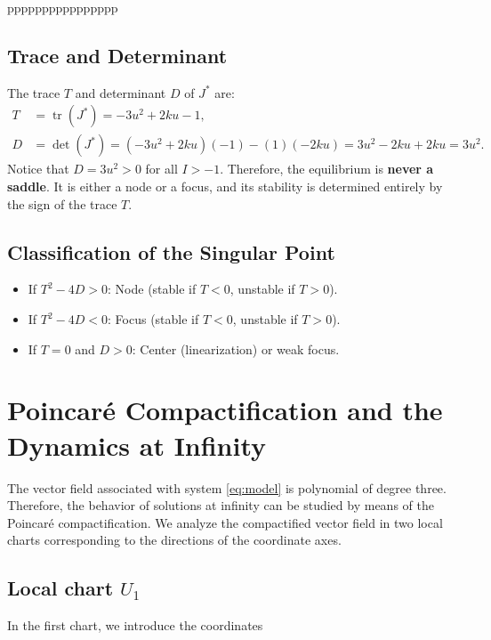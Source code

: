 \documentclass[11pt,reqno]{amsart}
\theoremstyle{plain}
\theoremstyle{definition}
\theoremstyle{remark}
\begin{document}
\newpage

pppppppppppppppp


\subsection{Trace and Determinant}
The trace \(T\) and determinant \(D\) of \(J^*\) are:
\begin{align}
T &= \operatorname{tr}(J^*) = -3u^2 + 2ku - 1, \\
D &= \det(J^*) = (-3u^2 + 2ku)(-1) - (1)(-2ku) = 3u^2 - 2ku + 2ku = 3u^2.
\end{align}
Notice that \(D = 3u^2 > 0\) for all \(I > -1\). Therefore, the equilibrium is \textbf{never a saddle}. It is either a node or a focus, and its stability is determined entirely by the sign of the trace \(T\).

\subsection{Classification of the Singular Point}
\begin{itemize}
    \item If \(T^2 - 4D > 0\): Node (stable if \(T < 0\), unstable if \(T > 0\)).
    \item If \(T^2 - 4D < 0\): Focus (stable if \(T < 0\), unstable if \(T > 0\)).
    \item If \(T = 0\) and \(D > 0\): Center (linearization) or weak focus.
\end{itemize}

\section{Poincar\'e Compactification and the Dynamics at Infinity}

\label{sec:infinity}

The vector field associated with system \eqref{eq:model} is polynomial of
degree three. Therefore, the behavior of solutions at infinity can be
studied by means of the Poincar\'e compactification. We analyze the
compactified vector field in two local charts corresponding to the
directions of the coordinate axes.


\subsection{Local chart \(U_1\)}

In the first chart, we introduce the coordinates
\end{document}
